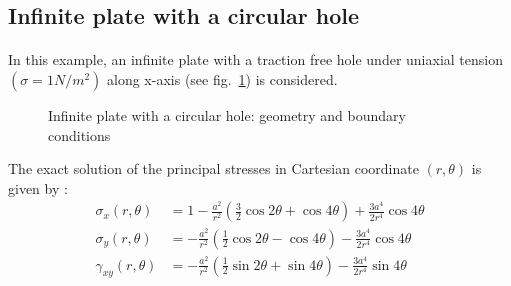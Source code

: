 \subsection{Infinite plate with a circular hole}
\paragraph{}
In this example, an infinite plate with a traction free hole under uniaxial tension $(\sigma = 1 N/m^2 )$
along x-axis (see fig.~\ref{iso_fig:circular_hole_geo_bc}) is considered.

    \begin{figure}[h!]
        \centering
        \caption{ Infinite plate with a circular hole: geometry and boundary conditions}
        \label{iso_fig:circular_hole_geo_bc}
    \end{figure}
    
The exact solution of the principal stresses in Cartesian coordinate $(r,\theta)$ is given by \cite{Sukumar2001}:
    \begin{subequations}
        \begin{align}
            \sigma_{x}(r,\theta) &= 1 - \frac{a^2}{r^2} \left(
                \frac{3}{2} \cos2\theta +
                \cos4\theta
            \right) +
            \frac{3a^4}{2r^4} \cos4\theta\\
            \sigma_{y}(r,\theta) &= -\frac{a^2}{r^2} \left(
                \frac{1}{2} \cos2\theta -
                \cos4\theta
            \right) -
            \frac{3a^4}{2r^4} \cos4\theta\\
            \gamma_{xy}(r,\theta) &= -\frac{a^2}{r^2} \left(
                \frac{1}{2} \sin2\theta +
                \sin4\theta
            \right) -
            \frac{3a^4}{2r^4} \sin4\theta
        \end{align}
        \label{iso_eq:ex_chole_stress_sol}
    \end{subequations}

